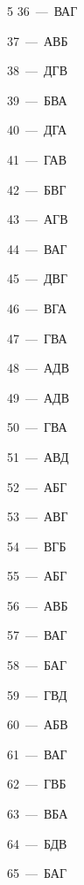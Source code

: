 \documentclass[12pt]{article}
\begin{document}
\begin{multicols}{5}
\mbox{36~--- ВАГ}\par
\mbox{37~--- АВБ}\par
\mbox{38~--- ДГВ}\par
\mbox{39~--- БВА}\par
\mbox{40~--- ДГА}\par
\mbox{41~--- ГАВ}\par
\mbox{42~--- БВГ}\par
\mbox{43~--- АГВ}\par
\mbox{44~--- ВАГ}\par
\mbox{45~--- ДВГ}\par
\mbox{46~--- ВГА}\par
\mbox{47~--- ГВА}\par
\mbox{48~--- АДВ}\par
\mbox{49~--- АДВ}\par
\mbox{50~--- ГВА}\par
\mbox{51~--- АВД}\par
\mbox{52~--- АБГ}\par
\mbox{53~--- АВГ}\par
\mbox{54~--- ВГБ}\par
\mbox{55~--- АБГ}\par
\mbox{56~--- АВБ}\par
\mbox{57~--- ВАГ}\par
\mbox{58~--- БАГ}\par
\mbox{59~--- ГВД}\par
\mbox{60~--- АБВ}\par
\mbox{61~--- ВАГ}\par
\mbox{62~--- ГВБ}\par
\mbox{63~--- ВБА}\par
\mbox{64~--- БДВ}\par
\mbox{65~--- БАГ}
\end{multicols}
\end{document}
